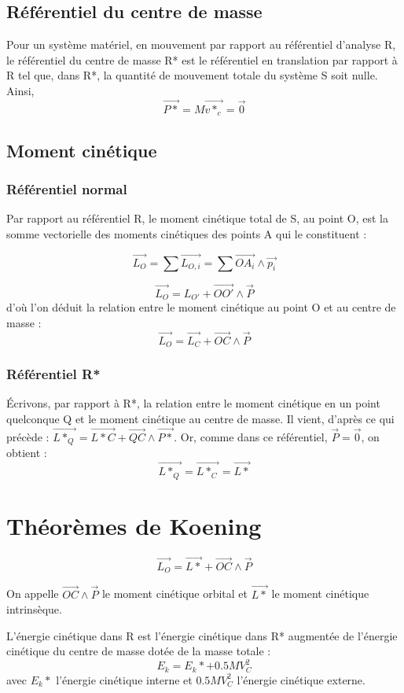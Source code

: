\documentclass[french]{yLectureNote}
\renewcommand{\vec}{\overrightarrow}
\begin{document}
\subsection{Référentiel du centre de masse}
Pour un système matériel, en mouvement par rapport au référentiel d'analyse R, le référentiel du centre de masse R* est le référentiel en translation par rapport à R tel que, dans R*, la quantité de mouvement totale du système S soit nulle. Ainsi, \[\vec{P*} = M\vec{v*_c} = \vec{0}\]
\subsection{Moment cinétique}
\subsubsection{Référentiel normal}
Par rapport au référentiel R, le moment cinétique total de S, au point O, est la somme vectorielle des moments cinétiques des points A qui le constituent :
\begin{theorem}
 \[\vec{L_O} = \sum\vec{L_{O,i}} = \sum \vec{OA_i}\wedge \vec{p_i}\]
\end{theorem}
\begin{proposition}
\[\vec{L_O} = L_{O'} + \vec{OO'}\wedge \vec{P}\] d'où l'on déduit la relation entre le moment cinétique au point O et au centre de masse : \[\vec{L_O} = \vec{L_C} + \vec{OC}\wedge \vec{P}\]
\end{proposition}
\subsubsection{Référentiel R*}
Écrivons, par rapport à R*, la relation entre le moment cinétique en un point quelconque Q et le moment cinétique au centre de masse. Il vient, d'après ce qui précède : \(\vec{L*_Q} = \vec{L*C} + \vec{QC}\wedge \vec{P*}\). Or, comme dans ce référentiel, \(\vec{P} = \vec{0}\), on obtient :
\[\vec{L*_Q} = \vec{L*_C} = \vec{L*}\]

\section{Théorèmes de Koening}
\begin{theorem}
\[\vec{L_O} = \vec{L*}+\vec{OC}\wedge \vec{P}\]
\end{theorem}
On appelle \(\vec{OC}\wedge \vec{P}\) le moment cinétique orbital et \(\vec{L*}\) le moment cinétique intrinsèque.
\begin{theorem}
L'énergie cinétique dans R est l'énergie cinétique dans R* augmentée de l'énergie cinétique du centre de masse dotée de la masse totale :
 \[E_k = E_k*+0.5MV^2_C\] avec \(E_k*\) l'énergie cinétique interne et \(0.5MV^2_C\) l'énergie cinétique externe.
\end{theorem}
\end{document}
